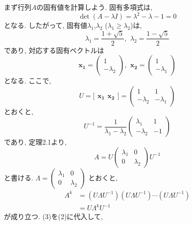 \documentclass[a4paper,12pt]{jarticle}
\begin{document}
まず行列$A$の固有値を計算しよう. 固有多項式は,
\[ \det (A - \lambda I ) = \lambda^2 - \lambda - 1 = 0 \]
となる. したがって, 固有値$\lambda_1$,$\lambda_2$ ($\lambda_1 \geq \lambda_2$)は,
\[\lambda_1 = \frac{1 + \sqrt{5}} {2}, \,\ \lambda_2 = \frac{1 - \sqrt{5}} {2} \]
であり, 対応する固有ベクトルは
\[ \bm{x_1} = \begin{pmatrix} 1 \\ -\lambda_2 \end{pmatrix}, \,\ \bm{x_2} = \begin{pmatrix} 1 \\ -\lambda_1 \end{pmatrix} \]
となる. ここで,
\[ U = \Big[ \,\ \bm{x_1} \,\ \bm{x_2} \,\ \Big] 
= \left( \begin{array} {cc} 1 & 1 \\ -\lambda_2 & -\lambda_1 \end{array} \right) \]
とおくと,
\[ U^{-1} = \frac{1}{\lambda_1 - \lambda_2} \left( \begin{array} {cc}
\lambda_1 & 1 \\ -\lambda_2 & -1 \end{array} \right)  \]
であり, 定理2.1より,
\[ A = U \begin{pmatrix} \lambda_1 & 0 \\ 0 & \lambda_2 \end{pmatrix} U^{-1} \]
と書ける. $\Lambda = \begin{pmatrix} \lambda_1 & 0 \\ 0 & \lambda_2 \end{pmatrix} $ とおくと,
\begin{align*} A^k &= (U \Lambda U^{-1}) (U \Lambda U^{-1}) \cdots (U \Lambda U^{-1}) \\
& = U \Lambda^k U^{-1} \end{align*}
が成り立つ. (3)を(2)に代入して,
\end{document}
